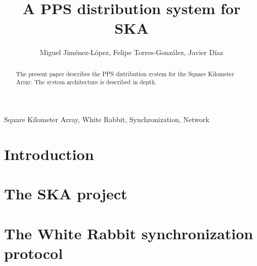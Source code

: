 \documentclass[review]{elsarticle}
\begin{document}
\begin{frontmatter}

\title{A PPS distribution system for SKA}


\author{Miguel Jiménez-López, Felipe Torres-González, Javier Díaz}
\address{CITIC, ETSIIT, University of Granada}





\begin{abstract} 
	The present paper describes the PPS distribution system for the Square Kilometer Array. The system architecture is described in depth. 
\end{abstract}

\begin{keyword}
	Square Kilometer Array, White Rabbit, Synchronization, Network
\end{keyword}

\end{frontmatter}

\linenumbers

\section{Introduction}

\section{The SKA project}

\section{The White Rabbit synchronization protocol}
\end{document}

